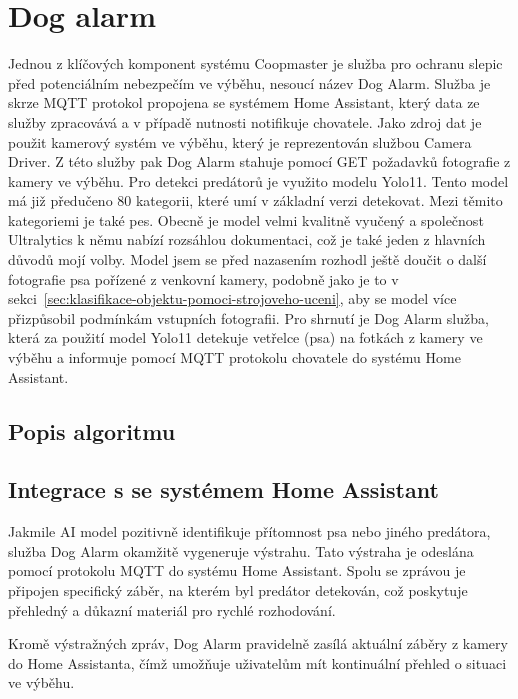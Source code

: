 \section{Dog alarm}\label{sec:dog-alarm}
Jednou z klíčových komponent systému Coopmaster je služba pro ochranu slepic před potenciálním nebezpečím ve výběhu, nesoucí název Dog Alarm.\newline
Služba je skrze MQTT protokol propojena se systémem Home Assistant, který data ze služby zpracovává a v případě nutnosti notifikuje chovatele.
Jako zdroj dat je použit kamerový systém ve výběhu, který je reprezentován službou Camera Driver.
Z této služby pak Dog Alarm stahuje pomocí GET požadavků fotografie z kamery ve výběhu.\newline
Pro detekci predátorů je využito modelu Yolo11.
Tento model má již předučeno 80 kategorii, které umí v základní verzi detekovat.
Mezi těmito kategoriemi je také pes.
Obecně je model velmi kvalitně vyučený a společnost Ultralytics k němu nabízí rozsáhlou dokumentaci, což je také jeden z hlavních důvodů mojí volby.
Model jsem se před nazasením rozhodl ještě doučit o další fotografie psa pořízené z venkovní kamery, podobně jako je to v sekci~\ref{sec:klasifikace-objektu-pomoci-strojoveho-uceni}, aby se model více přizpůsobil podmínkám vstupních fotografii.\newline
Pro shrnutí je Dog Alarm služba, která za použití model Yolo11 detekuje vetřelce (psa) na fotkách z kamery ve výběhu a informuje pomocí MQTT protokolu chovatele do systému Home Assistant.

\subsection*{Popis algoritmu}
\subsection*{Integrace s se systémem Home Assistant}

Jakmile AI model pozitivně identifikuje přítomnost psa nebo jiného predátora, služba Dog Alarm okamžitě vygeneruje výstrahu.
Tato výstraha je odeslána pomocí protokolu MQTT do systému Home Assistant.
Spolu se zprávou je připojen specifický záběr, na kterém byl predátor detekován, což poskytuje přehledný a důkazní materiál pro rychlé rozhodování.

Kromě výstražných zpráv, Dog Alarm pravidelně zasílá aktuální záběry z kamery do Home Assistanta, čímž umožňuje uživatelům mít kontinuální přehled o situaci ve výběhu.

